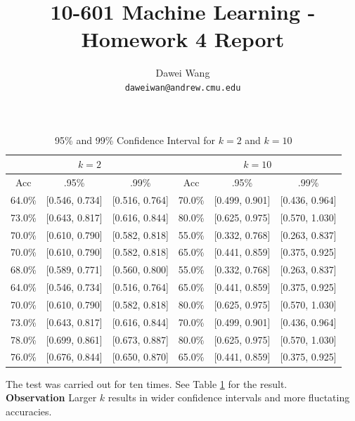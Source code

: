 \documentclass{article}
\begin{document}
\title{10-601 Machine Learning - Homework 4 Report}
\author{Dawei Wang \\ {\tt daweiwan@andrew.cmu.edu}}

\maketitle

\begin{table}[h!]
	\centering
	\caption{95\% and 99\% Confidence Interval for $k=2$ and $k=10$}\vspace{4pt}
	\label{confinterval}
	\begin{tabular}{cccccc} \toprule
	\multicolumn{3}{c}{$k=2$} & \multicolumn{3}{c}{$k=10$} \\ \midrule
	Acc & .95\% & .99\% &	Acc & .95\% & .99\% \\ \midrule
	64.0\% & [0.546, 0.734] & [0.516, 0.764] & 70.0\% & [0.499, 0.901] & [0.436, 0.964] \\ 
	73.0\% & [0.643, 0.817] & [0.616, 0.844] & 80.0\% & [0.625, 0.975] & [0.570, 1.030] \\
	70.0\% & [0.610, 0.790] & [0.582, 0.818] & 55.0\% & [0.332, 0.768] & [0.263, 0.837] \\
	70.0\% & [0.610, 0.790] & [0.582, 0.818] & 65.0\% & [0.441, 0.859] & [0.375, 0.925] \\
	68.0\% & [0.589, 0.771] & [0.560, 0.800] & 55.0\% & [0.332, 0.768] & [0.263, 0.837] \\
	64.0\% & [0.546, 0.734] & [0.516, 0.764] & 65.0\% & [0.441, 0.859] & [0.375, 0.925] \\
	70.0\% & [0.610, 0.790] & [0.582, 0.818] & 80.0\% & [0.625, 0.975] & [0.570, 1.030] \\
	73.0\% & [0.643, 0.817] & [0.616, 0.844] & 70.0\% & [0.499, 0.901] & [0.436, 0.964] \\
	78.0\% & [0.699, 0.861] & [0.673, 0.887] & 80.0\% & [0.625, 0.975] & [0.570, 1.030] \\
	76.0\% & [0.676, 0.844] & [0.650, 0.870] & 65.0\% & [0.441, 0.859] & [0.375, 0.925] \\ \bottomrule
	\end{tabular}
\end{table}

 The test was carried out for ten times.
See Table \ref{confinterval} for the result. \\
{\bf Observation} Larger $k$ results in wider confidence intervals and more fluctating accuracies. 
\end{document}
